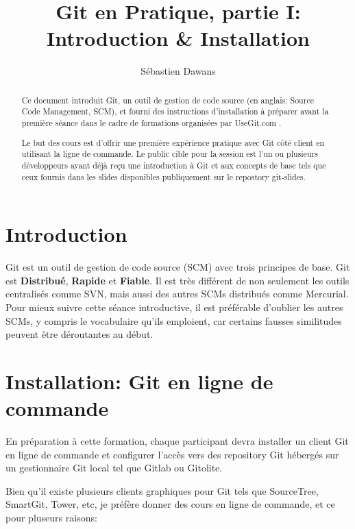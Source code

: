 \documentclass{../../common/tufte-latex/tufte-handout}
\title{Git en Pratique, partie I: Introduction \& Installation}
\author{S\'ebastien Dawans}
\begin{document}
\maketitle%

\begin{abstract}
\noindent
Ce document introduit Git, un outil de gestion de code source (en anglais: Source Code Management, SCM), et fourni des instructions d'installation à préparer avant la première séance dans le cadre de formations organisées par UseGit.com .

Le but des cours est d'offrir une première expérience pratique avec Git côté client en utilisant la ligne de commande. 
Le public cible pour la session est l'un ou plusieurs développeurs ayant déjà reçu une introduction à Git et aux concepts de base tels que ceux fournis dans les slides disponibles publiquement sur le repostory git-slides. 
\end{abstract}


\section{Introduction}\label{sec:intro}

Git est un outil de gestion de code source (SCM) avec trois principes de base.
Git est \textbf{Distribué}, \textbf{Rapide} et \textbf{Fiable}.
Il est très différent de non seulement les outils centralisés comme SVN, mais aussi des autres SCMs distribués comme Mercurial.
Pour mieux suivre cette séance introductive, il est préférable d'oublier les autres SCMs, y compris le vocabulaire qu'ils emploient, car certains fausses similitudes peuvent être déroutantes au début.

\section{Installation: Git en ligne de commande}

En préparation à cette formation, chaque participant devra installer un client Git en ligne de commande et configurer l'accès vers des repository Git hébergés sur un gestionnaire Git local tel que Gitlab ou Gitolite.

Bien qu'il existe plusieurs clients graphiques pour Git tels que SourceTree, SmartGit, Tower, etc, je préfère donner des cours en ligne de commande, et ce pour pluseurs raisons:
\end{document}
